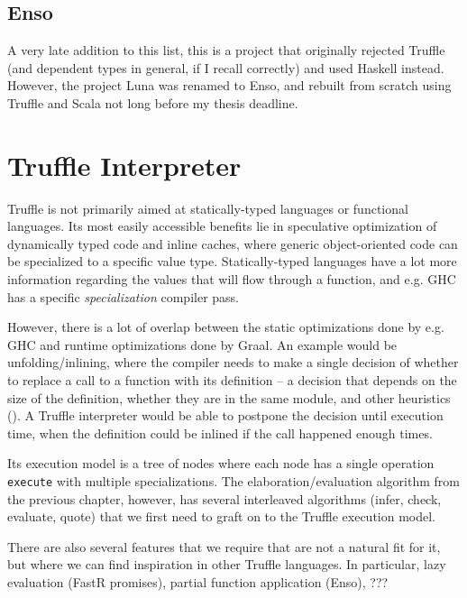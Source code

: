 \documentclass[english,zadani,odsaz]{fitthesis}
\begin{document}
\subsection{Enso}
\label{sec:org7c71c80}
A very late addition to this list, this is a project that originally rejected
Truffle (and dependent types in general, if I recall correctly) and used Haskell
instead. However, the project Luna was renamed to Enso, and rebuilt from scratch
using Truffle and Scala not long before my thesis deadline. 

\section{Truffle Interpreter}
\label{sec:org5552eae}
Truffle is not primarily aimed at statically-typed languages or functional
languages. Its most easily accessible benefits lie in speculative optimization
of dynamically typed code and inline caches, where generic object-oriented code
can be specialized to a specific value type. Statically-typed languages have a
lot more information regarding the values that will flow through a function, and
e.g. GHC has a specific \emph{specialization} compiler pass.

However, there is a lot of overlap between the static optimizations done by
e.g. GHC and runtime optimizations done by Graal. An example would be
unfolding/inlining, where the compiler needs to make a single decision of
whether to replace a call to a function with its definition -- a decision that
depends on the size of the definition, whether they are in the same module, and
other heuristics (). A Truffle interpreter would be able to postpone the decision
until execution time, when the definition could be inlined if the call happened
enough times.

Its execution model is a tree of nodes where each node has a single operation
\texttt{execute} with multiple specializations. The elaboration/evaluation algorithm from
the previous chapter, however, has several interleaved algorithms (infer, check,
evaluate, quote) that we first need to graft on to the Truffle execution model.

There are also several features that we require that are not a natural fit for
it, but where we can find inspiration in other Truffle languages. In particular,
lazy evaluation (FastR promises), partial function application (Enso), ???
\end{document}
